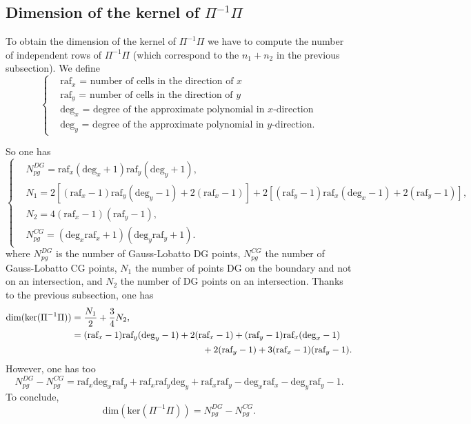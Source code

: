 \documentclass[a4paper, 11pt]{report}
\begin{document}
\subsection{Dimension of the kernel of $\Pi^{-1}\Pi$}

To obtain the dimension of the kernel of $\Pi^{-1}\Pi$ we have to compute the number of independent rows of $\Pi^{-1}\Pi$ (which correspond to the $n_1+n_2$ in the previous subsection).
We define
\begin{equation*}
\left\{
\begin{split}
&\text{raf}_x\text{ = number of cells in the direction of $x$}\\
&\text{raf}_y\text{ = number of cells in the direction of $y$}\\
&\text{deg}_x\text{ = degree of the approximate polynomial in $x$-direction}\\
&\text{deg}_y\text{ = degree of the approximate polynomial in $y$-direction}.
\end{split}
\right.
\end{equation*}

So one has
\begin{equation*}
\left\{\begin{split}
&N_{pg}^{DG}=\text{raf}_x(\text{deg}_x+1)\text{raf}_y(\text{deg}_y+1),\\
&N_1=2[(\text{raf}_x-1)\text{raf}_y(\text{deg}_y-1)+2(\text{raf}_x-1)]+2[(\text{raf}_y-1)\text{raf}_x(\text{deg}_x-1)+2(\text{raf}_y-1)],\\
&N_2=4(\text{raf}_x-1)(\text{raf}_y-1),\\
&N_{pg}^{CG}=(\text{deg}_x\text{raf}_x+1)(\text{deg}_y\text{raf}_y+1).
\end{split}
\right.
\end{equation*}
where $N_{pg}^{DG}$ is the number of Gauss-Lobatto DG points, $N_{pg}^{CG}$ the number of Gauss-Lobatto CG points, $N_1$ the number of points DG on the boundary and not on an intersection, and $N_2$ the number of DG points on an intersection.
Thanks to the previous subsection, one has
\begin{equation*}
\begin{split}
\text{dim}(\text{ker}(\Pi^{-1}\Pi))&=\frac{N_1}{2}+\frac{3}{4}N_2,\\
&=(\text{raf}_x-1)\text{raf}_y(\text{deg}_y-1)+2(\text{raf}_x-1)+(\text{raf}_y-1)\text{raf}_x(\text{deg}_x-1)\\
&\hspace*{5cm}+2(\text{raf}_y-1)+3(\text{raf}_x-1)(\text{raf}_y-1).
\end{split}
\end{equation*} 
However, one has too
\begin{equation*}
N_{pg}^{DG}-N_{pg}^{CG}=\text{raf}_x\text{deg}_x\text{raf}_y+\text{raf}_x\text{raf}_y\text{deg}_y+\text{raf}_x\text{raf}_y-\text{deg}_x\text{raf}_x-\text{deg}_y\text{raf}_y-1.
\end{equation*}
To conclude, 
\begin{equation*}
\text{dim}(\text{ker}(\Pi^{-1}\Pi))=N_{pg}^{DG}-N_{pg}^{CG}.
\end{equation*}
\end{document}
